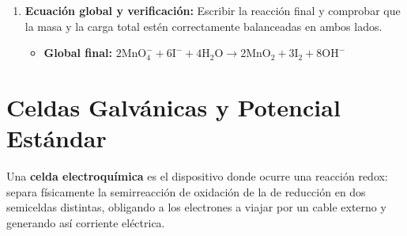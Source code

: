 \documentclass[letterpaper, 12pt, twoside]{article}
\newenvironment{formulabox}[1]{%
    \begin{tcolorbox}[colback=rojoSuave, colframe=rojoFuerte,
        title=\textbf{#1}, fonttitle=\bfseries]
}{%
    \end{tcolorbox}
}
\begin{document}
\begin{formulabox}{Pasos — Medio Básico}
\begin{enumerate}[leftmargin=15pt, itemsep=0.3em]
    \begin{itemize}[leftmargin=15pt, topsep=2pt, itemsep=0pt]
        \item \textit{(Los $8\text{H}^+$ y $8\text{OH}^-$ de la izquierda forman $8\text{H}_2\text{O}$. Luego restamos las $4\text{H}_2\text{O}$ de la derecha a las $8\text{H}_2\text{O}$ de la izquierda)}
        \item \textbf{Simplificación:} $2\text{MnO}_4^- + 6\text{I}^- + \mathbf{4H_2O} \rightarrow 2\text{MnO}_2 + 3\text{I}_2 + \mathbf{8OH^-}$
    \end{itemize}
\vspace{0.1cm}
    \item \textbf{Ecuación global y verificación:} Escribir la reacción final y comprobar que la masa y la carga total estén correctamente balanceadas en ambos lados.
    \begin{itemize}[leftmargin=15pt, topsep=2pt, itemsep=0pt]
        \item \textbf{Global final:} $2\text{MnO}_4^- + 6\text{I}^- + 4\text{H}_2\text{O} \rightarrow 2\text{MnO}_2 + 3\text{I}_2 + 8\text{OH}^-$
       
    \end{itemize}
\end{enumerate}
\end{formulabox}

\newpage

\section*{Celdas Galvánicas y Potencial Estándar}

Una \textbf{celda electroquímica} es el dispositivo donde ocurre una reacción redox: separa físicamente la semirreacción de oxidación de la de reducción en dos semiceldas distintas, obligando a los electrones a viajar por un cable externo y generando así corriente eléctrica.
\end{document}
